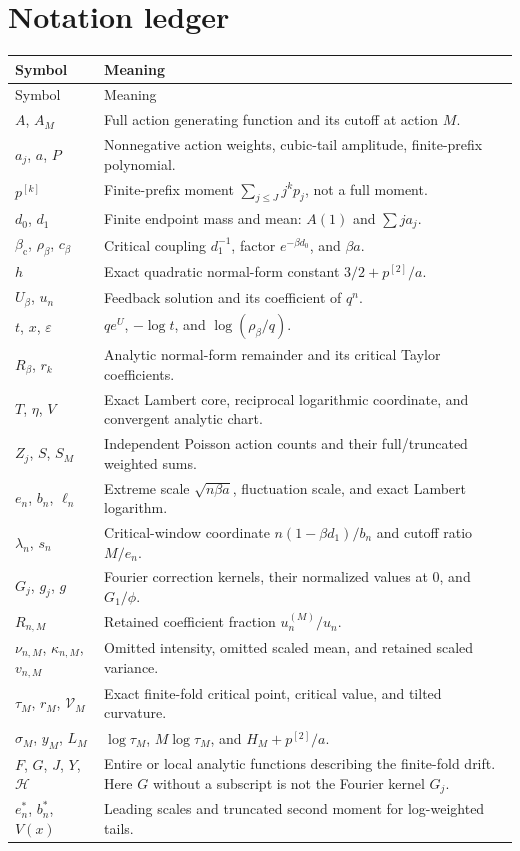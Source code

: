\documentclass[11pt,a4paper]{article}
\numberwithin{equation}{section}
\theoremstyle{definition}
\theoremstyle{remark}
\newcommand{\bc}{\beta_{\mathrm c}}
\newcommand{\ph}{\phi}
\newcommand{\eps}{\varepsilon}
\begin{document}
\section{Notation ledger}
\small
\begin{longtable}{p{}p{}}
\toprule
Symbol & Meaning\\
\midrule
\endfirsthead
\toprule
Symbol & Meaning\\
\midrule
\endhead
$A$, $A_M$ & Full action generating function and its cutoff at action $M$.\\
$a_j$, $a$, $P$ & Nonnegative action weights, cubic-tail amplitude, finite-prefix polynomial.\\
$p^{[k]}$ & Finite-prefix moment $\sum_{j\le J}j^kp_j$, not a full moment.\\
$d_0$, $d_1$ & Finite endpoint mass and mean: $A(1)$ and $\sum j a_j$.\\
$\bc$, $\rho_\beta$, $c_\beta$ & Critical coupling $d_1^{-1}$, factor $e^{-\beta d_0}$, and $\beta a$.\\
$h$ & Exact quadratic normal-form constant $3/2+p^{[2]}/a$.\\
$U_\beta$, $u_n$ & Feedback solution and its coefficient of $q^n$.\\
$t$, $x$, $\eps$ & $qe^U$, $-\log t$, and $\log(\rho_\beta/q)$.\\
$R_\beta$, $r_k$ & Analytic normal-form remainder and its critical Taylor coefficients.\\
$T$, $\eta$, $V$ & Exact Lambert core, reciprocal logarithmic coordinate, and convergent analytic chart.\\
$Z_j$, $S$, $S_M$ & Independent Poisson action counts and their full/truncated weighted sums.\\
$e_n$, $b_n$, $\ell_n$ & Extreme scale $\sqrt{n\beta a}$, fluctuation scale, and exact Lambert logarithm.\\
$\lambda_n$, $s_n$ & Critical-window coordinate $n(1-\beta d_1)/b_n$ and cutoff ratio $M/e_n$.\\
$G_j$, $g_j$, $g$ & Fourier correction kernels, their normalized values at $0$, and $G_1/\ph$.\\
$R_{n,M}$ & Retained coefficient fraction $u_n^{(M)}/u_n$.\\
$\nu_{n,M}$, $\kappa_{n,M}$, $v_{n,M}$ & Omitted intensity, omitted scaled mean, and retained scaled variance.\\
$\tau_M$, $r_M$, $\mathcal V_M$ & Exact finite-fold critical point, critical value, and tilted curvature.\\
$\sigma_M$, $y_M$, $L_M$ & $\log\tau_M$, $M\log\tau_M$, and $H_M+p^{[2]}/a$.\\
$F$, $G$, $J$, $Y$, $\mathcal H$ & Entire or local analytic functions describing the finite-fold drift. Here $G$ without a subscript is not the Fourier kernel $G_j$.\\
$e_n^*$, $b_n^*$, $V(x)$ & Leading scales and truncated second moment for log-weighted tails.\\
\bottomrule
\end{longtable}
\normalsize
\end{document}
